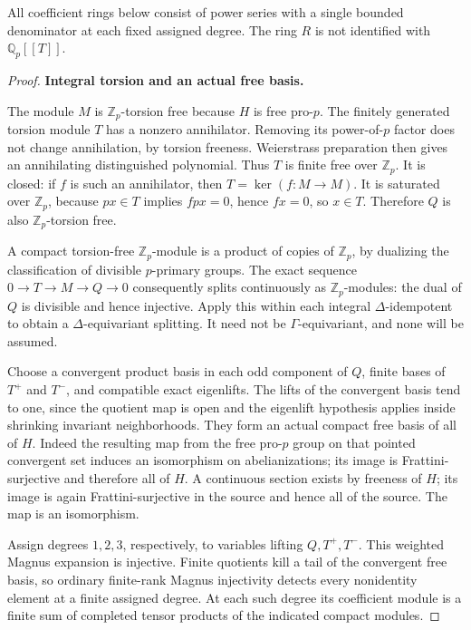 All coefficient rings below consist of power series with a single bounded denominator at each fixed assigned degree. The ring \(R\) is not identified with \(\mathbb Q_p[[T]]\).

\begin{proof}
\par\medskip\noindent\textbf{Integral torsion and an actual free basis.}

The module \(M\) is \(\mathbb Z_p\)-torsion free because \(H\) is free pro-\(p\). The finitely generated torsion module \(T\) has a nonzero annihilator. Removing its power-of-\(p\) factor does not change annihilation, by torsion freeness. Weierstrass preparation then gives an annihilating distinguished polynomial. Thus \(T\) is finite free over \(\mathbb Z_p\). It is closed: if \(f\) is such an annihilator, then \(T=\ker(f:M\to M)\). It is saturated over \(\mathbb Z_p\), because \(p x\in T\) implies \(fpx=0\), hence \(fx=0\), so \(x\in T\). Therefore \(Q\) is also \(\mathbb Z_p\)-torsion free.

A compact torsion-free \(\mathbb Z_p\)-module is a product of copies of \(\mathbb Z_p\), by dualizing the classification of divisible \(p\)-primary groups. The exact sequence \(0\to T\to M\to Q\to0\) consequently splits continuously as \(\mathbb Z_p\)-modules: the dual of \(Q\) is divisible and hence injective. Apply this within each integral \(\Delta\)-idempotent to obtain a \(\Delta\)-equivariant splitting. It need not be \(\Gamma\)-equivariant, and none will be assumed.

Choose a convergent product basis in each odd component of \(Q\), finite bases of \(T^+\) and \(T^-\), and compatible exact eigenlifts. The lifts of the convergent basis tend to one, since the quotient map is open and the eigenlift hypothesis applies inside shrinking invariant neighborhoods. They form an actual compact free basis of all of \(H\). Indeed the resulting map from the free pro-\(p\) group on that pointed convergent set induces an isomorphism on abelianizations; its image is Frattini-surjective and therefore all of \(H\). A continuous section exists by freeness of \(H\); its image is again Frattini-surjective in the source and hence all of the source. The map is an isomorphism.

Assign degrees \(1,2,3\), respectively, to variables lifting \(Q,T^+,T^-\). This weighted Magnus expansion is injective. Finite quotients kill a tail of the convergent free basis, so ordinary finite-rank Magnus injectivity detects every nonidentity element at a finite assigned degree. At each such degree its coefficient module is a finite sum of completed tensor products of the indicated compact modules.


\end{proof}
